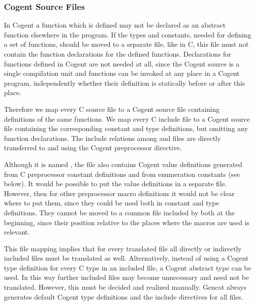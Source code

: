 \subsubsection{Cogent Source Files}

In Cogent a function which is defined may not be declared as an abstract function elsewhere in the program. If the types and constants,
needed for defining a set of functions, should be moved to a separate file, like in C, this file must not contain the 
function declarations for the defined functions. Declarations for functions defined in Cogent are not needed at all, since the Cogent 
source is a single compilation unit and functions can be invoked at any place in a Cogent program, independently whether their definition 
is statically before or after this place.

Therefore we map every C source file  to a Cogent source file  containing definitions of the same 
functions. We map every C include file  to a Cogent source file  
containing the corresponding constant and type definitions, but omitting any function declarations. The include relations among 
 and  files are directly transferred to  and  using the Cogent preprocessor 
 directive. 

Although it is named , the file also contains Cogent value definitions generated from C preprocessor
constant definitions and from enumeration constants (see below). It would be possible to put the value definitions in a 
separate file. However, then for other preprocessor macro definitions it would not be clear where to put them, since they could
be used both in constant and type definitions. They cannot be moved to a common file included by both at the beginning,
since their position relative to the places where the macros are used is relevant.

This file mapping implies that for every translated  file all directly or indirectly included  files must be 
translated as well.
Alternatively, instead of using a Cogent type definition for every C type in an included  file, a Cogent abstract type
can be used. In this way further included  files may become unnecessary and need not be translated. However, this
must be decided and realized manually. Gencot always generates default Cogent type definitions and the include directives for all
 files.


